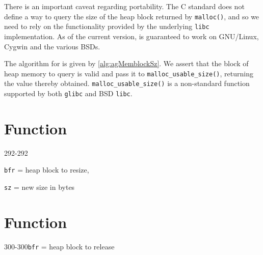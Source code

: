 
There is an important caveat regarding portability. The C standard does not
define a way to query the size of the heap block returned by \verb|malloc()|,
and so we need to rely on the functionality provided by the underlying
\verb|libc| implementation. As of the current version, \agMemblockSz is
guaranteed to work on GNU/Linux, Cygwin and the various BSDs.

The algorithm for \agMemblockSz is given by \ref{alg:agMemblockSz}. We assert
that the block of heap memory to query is valid and pass it to
\verb|malloc_usable_size()|, returning the value thereby obtained.
\verb|malloc_usable_size()| is a non-standard function supported by both
\verb|glibc| and BSD \verb|libc|.


%
%
\section{Function \agMemblockResize}
  {292-292}{\texttt{bfr} = heap block to resize,\par\texttt{sz} = new size in
  bytes}
\kant[1]


%
%
\section{Function \agMemblockFree}
  {300-300}{\texttt{bfr} = heap block to release}
\kant[1]
